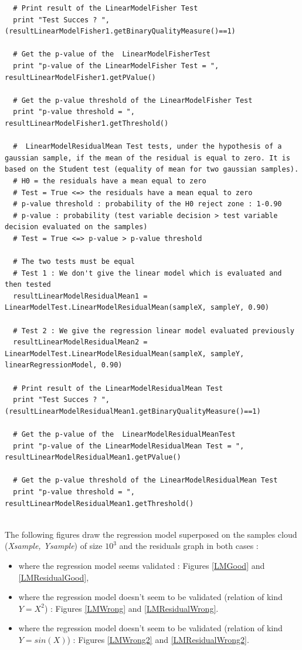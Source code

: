 \begin{lstlisting}
  # Print result of the LinearModelFisher Test
  print "Test Succes ? ", (resultLinearModelFisher1.getBinaryQualityMeasure()==1)

  # Get the p-value of the  LinearModelFisherTest
  print "p-value of the LinearModelFisher Test = ", resultLinearModelFisher1.getPValue()

  # Get the p-value threshold of the LinearModelFisher Test
  print "p-value threshold = ", resultLinearModelFisher1.getThreshold()

  #  LinearModelResidualMean Test tests, under the hypothesis of a  gaussian sample, if the mean of the residual is equal to zero. It is based on the Student test (equality of mean for two gaussian samples).
  # H0 = the residuals have a mean equal to zero
  # Test = True <=> the residuals have a mean equal to zero
  # p-value threshold : probability of the H0 reject zone : 1-0.90
  # p-value : probability (test variable decision > test variable decision evaluated on the samples)
  # Test = True <=> p-value > p-value threshold

  # The two tests must be equal
  # Test 1 : We don't give the linear model which is evaluated and then tested
  resultLinearModelResidualMean1 = LinearModelTest.LinearModelResidualMean(sampleX, sampleY, 0.90)

  # Test 2 : We give the regression linear model evaluated previously
  resultLinearModelResidualMean2 = LinearModelTest.LinearModelResidualMean(sampleX, sampleY, linearRegressionModel, 0.90)

  # Print result of the LinearModelResidualMean Test
  print "Test Succes ? ", (resultLinearModelResidualMean1.getBinaryQualityMeasure()==1)

  # Get the p-value of the  LinearModelResidualMeanTest
  print "p-value of the LinearModelResidualMean Test = ", resultLinearModelResidualMean1.getPValue()

  # Get the p-value threshold of the LinearModelResidualMean Test
  print "p-value threshold = ", resultLinearModelResidualMean1.getThreshold()
\end{lstlisting}
\textspace\\



The following figures draw the regression model superposed on the samples cloud ({\itshape Xsample, Ysample}) of size $10^3$ and the residuals graph in both cases :
\begin{itemize}
\item where the regression model seems validated : Figures  \ref{LMGood} and \ref{LMResidualGood},
\item where the regression model doesn't seem to be validated (relation of kind $Y = X^2$) : Figures  \ref{LMWrong} and \ref{LMResidualWrong}.
\item where the regression model doesn't seem to be validated (relation of kind $Y = sin(X)$) : Figures  \ref{LMWrong2} and \ref{LMResidualWrong2}.
\end{itemize}


